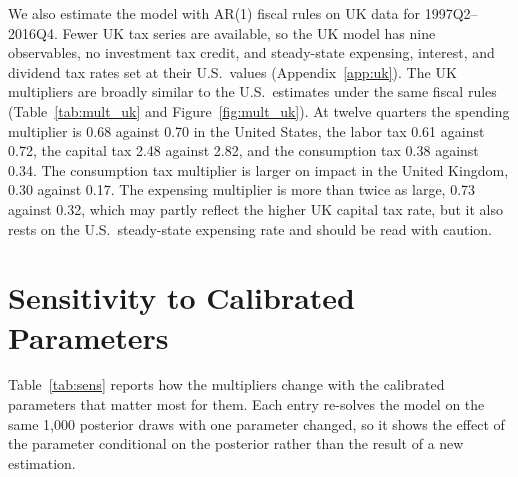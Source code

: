 \documentclass[article,11pt,letterpaper,fleqn]{article}
\theoremstyle{definition}
\numberwithin{equation}{section}
\begin{document}
We also estimate the model with AR(1) fiscal rules on UK data for 1997Q2--2016Q4. Fewer UK tax series are available, so the UK model has nine observables, no investment tax credit, and steady-state expensing, interest, and dividend tax rates set at their U.S.\ values (Appendix~\ref{app:uk}). The UK multipliers are broadly similar to the U.S.\ estimates under the same fiscal rules (Table~\ref{tab:mult_uk} and Figure~\ref{fig:mult_uk}). At twelve quarters the spending multiplier is 0.68 against 0.70 in the United States, the labor tax 0.61 against 0.72, the capital tax 2.48 against 2.82, and the consumption tax 0.38 against 0.34. The consumption tax multiplier is larger on impact in the United Kingdom, 0.30 against 0.17. The expensing multiplier is more than twice as large, 0.73 against 0.32, which may partly reflect the higher UK capital tax rate, but it also rests on the U.S.\ steady-state expensing rate and should be read with caution.






\section{Sensitivity to Calibrated Parameters}
\label{sec:sens_params}

Table~\ref{tab:sens} reports how the multipliers change with the calibrated parameters that matter most for them. Each entry re-solves the model on the same 1{,}000 posterior draws with one parameter changed, so it shows the effect of the parameter conditional on the posterior rather than the result of a new estimation.
\end{document}
